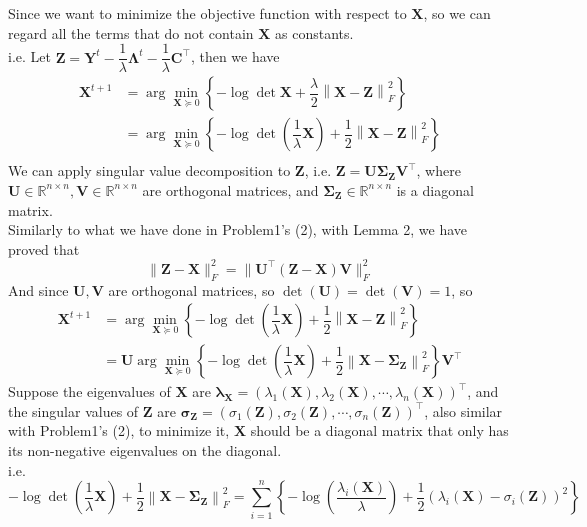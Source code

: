 Since we want to minimize the objective function with respect to $\mathbf{X}$, so we can regard all the terms that do not contain $\mathbf{X}$ as constants. \\
i.e. Let $\mathbf{Z}= \mathbf{Y}^t-\dfrac{1}{\lambda}\mathbf{\Lambda}^t-\dfrac{1}{\lambda}\mathbf{C^{\top}}$, then we have
\begin{align*}
\mathbf{X}^{t+1} &= \arg\min_{\mathbf{X}\succeq 0}\left\{-\log\det \mathbf{X}+\dfrac{\lambda}{2}\left\|\mathbf{X}-\mathbf{Z}\right\|_F^2\right\} \\
&= \arg\min_{\mathbf{X}\succeq 0}\left\{-\log\det (\dfrac{1}{\lambda}\mathbf{X})+\dfrac{1}{2}\left\|\mathbf{X}-\mathbf{Z}\right\|_F^2\right\} \\
\end{align*}
We can apply singular value decomposition to $\mathbf{Z}$, i.e. $\mathbf{Z}=\mathbf{U}\mathbf{\Sigma}_{\mathbf{Z}}\mathbf{V}^{\top}$, where $\mathbf{U}\in \mathbb{R}^{n\times n},\mathbf{V}\in \mathbb{R}^{n\times n}$ are orthogonal matrices, and $\mathbf{\Sigma}_{\mathbf{Z}}\in \mathbb{R}^{n\times n}$ is a diagonal matrix.\\
Similarly to what we have done in Problem1's (2), with Lemma 2, we have proved that
$$\|\mathbf{Z}-\mathbf{X}\|_F^2 = \|\mathbf{U}^{\top}(\mathbf{Z}-\mathbf{X})\mathbf{V}\|_F^2$$
And since $\mathbf{U},\mathbf{V}$ are orthogonal matrices, so $\det(\mathbf{U})=\det(\mathbf{V})=1$, so
\begin{align*}
\mathbf{X}^{t+1} &= \arg\min_{\mathbf{X}\succeq 0}\left\{-\log\det (\dfrac{1}{\lambda}\mathbf{X})+\dfrac{1}{2}\left\|\mathbf{X}-\mathbf{Z}\right\|_F^2\right\} \\
&= \mathbf{U} \arg\min_{\mathbf{X}\succeq 0}\left\{-\log\det (\dfrac{1}{\lambda}\mathbf{X})+\dfrac{1}{2}\left\|\mathbf{X}-\mathbf{\Sigma}_{\mathbf{Z}}\right\|_F^2\right\} \mathbf{V}^{\top}
\end{align*}
Suppose the eigenvalues of $\mathbf{X}$ are $\boldsymbol{\lambda}_{\mathbf{X}}=(\lambda_1(\mathbf{X}),\lambda_2(\mathbf{X}),\cdots,\lambda_n(\mathbf{X}))^{\top}$, and the singular values of $\mathbf{Z}$ are $\boldsymbol{\sigma}_{\mathbf{Z}}=(\sigma_1(\mathbf{Z}),\sigma_2(\mathbf{Z}),\cdots,\sigma_n(\mathbf{Z}))^{\top}$, also similar with Problem1's (2), to minimize it, $\mathbf{X}$ should be a diagonal matrix that only has its non-negative eigenvalues on the diagonal.\\
i.e.
$$-\log\det (\dfrac{1}{\lambda}\mathbf{X})+\dfrac{1}{2}\left\|\mathbf{X}-\mathbf{\Sigma}_{\mathbf{Z}}\right\|_F^2=\sum_{i=1}^{n}\left\{-\log\left(\dfrac{\lambda_i(\mathbf{X})}{\lambda}\right)+\dfrac{1}{2}(\lambda_i(\mathbf{X})-\sigma_i(\mathbf{Z}))^2\right\}$$

